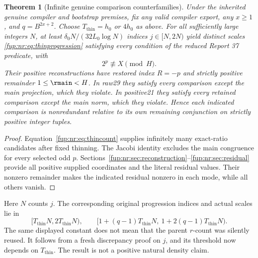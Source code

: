 \documentclass[11pt,letterpaper]{article}
\newtheorem{theorem}{Theorem}[section]
\theoremstyle{definition}\newtheorem{definition}[theorem]{Definition}
\theoremstyle{remark}\newtheorem{remark}[theorem]{Remark}
\begin{document}
\begin{theorem}[Infinite genuine comparison counterfamilies]\label{fup:nr:thm:misses}
Under the inherited genuine compiler and bootstrap premises, fix any valid compiler export, any $x\ge1$, and $q=B^{2x+2}$. Choose $T_{\mathrm{thin}}=h_0$ or $4h_0$ as above. For all sufficiently large integers $N$, at least $\delta_0N/(32L_0\log N)$ indices $j\in[N,2N)$ yield distinct scales \eqref{fup:nr:eq:thinprogression} satisfying every condition of the reduced Report 37 predicate, with
\[
 2^p\not\equiv X\pmod H.
\]
Their positive reconstructions have restored index $R=-p$ and strictly positive remainder $1\le\rmain<H$. In raw29 they satisfy every comparison except the main projection, which they violate. In positive21 they satisfy every retained comparison except the main norm, which they violate. Hence each indicated comparison is nonredundant relative to its own remaining conjunction on strictly positive integer tuples.
\end{theorem}
\begin{proof}
Equation~\eqref{fup:nr:eq:thincount} supplies infinitely many exact-ratio candidates after fixed thinning. The Jacobi identity excludes the main congruence for every selected odd $p$. Sections~\ref{fup:nr:sec:reconstruction}--\ref{fup:nr:sec:residual} provide all positive supplied coordinates and the literal residual values. Their nonzero remainder makes the indicated residual nonzero in each mode, while all others vanish.
\end{proof}
Here $N$ counts $j$. The corresponding original progression indices and actual scales lie in
\[
 [T_{\mathrm{thin}}N,2T_{\mathrm{thin}}N),\qquad
 [1+(q-1)T_{\mathrm{thin}}N,\ 1+2(q-1)T_{\mathrm{thin}}N).
\]
The same displayed constant does not mean that the parent $r$-count was silently reused. It follows from a fresh discrepancy proof on $j$, and its threshold now depends on $T_{\mathrm{thin}}$. The result is not a positive natural density claim.
\end{document}
